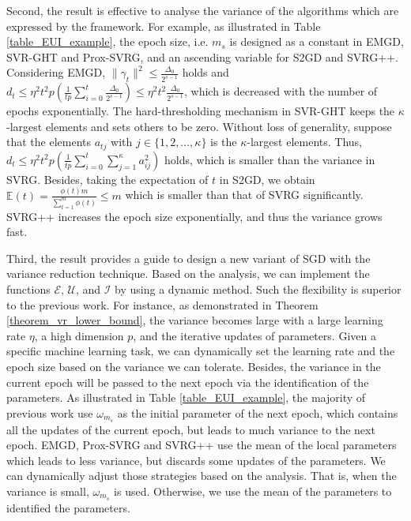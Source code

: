 \documentclass[letterpaper]{article}
\begin{document}
Second, the result is effective to analyse the variance of the algorithms which are expressed by the framework. For example, as illustrated in Table \ref{table_EUI_example}, the epoch size, i.e. $m_s$ is designed as a constant in EMGD, SVR-GHT and Prox-SVRG, and  an ascending variable for  S2GD and SVRG++. Considering EMGD,  $\parallel \gamma_t \parallel^2 \le \frac{\Delta_0}{2^{s-1}}$ holds and $d_t\mathrm{\le} \eta^2 t^2 p \left( \frac{1}{tp}\sum\limits_{i=0}^t   \frac{\Delta_0}{2^{s-1}} \right) \mathrm{\le}  \eta^2t^2 \frac{\Delta_0}{2^{s-1}}$, which is decreased with the number of epochs exponentially. The hard-thresholding mechanism in SVR-GHT keeps the $\kappa$-largest elements and sets others to be zero. Without loss of generality, suppose that the elements $a_{tj}$ with $j\mathrm{\in}\{1,2, ..., \kappa\}$ is the $\kappa$-largest elements. Thus, $d_t \mathrm{\le}  \eta^2 t^2p  \left( \frac{1}{tp}\sum\limits_{i=0}^t   \sum\limits_{j=1}^{\kappa}   a_{ij}^2 \right)$  holds, which is smaller than the variance in SVRG. Besides, taking the expectation of $t$ in S2GD, we obtain $\mathbb{E}(t)=\frac{\phi(t)m}{\sum_{t=1}^m \phi(t)} \mathrm{\le}  m$ which is smaller than that of SVRG significantly. SVRG++ increases the epoch size exponentially, and thus the variance grows fast.  

Third, the result provides a guide to design a new variant of SGD with the variance reduction technique.   Based on the analysis, we can implement the functions  $\mathcal{E}$, $\mathcal{U}$, and $\mathcal{I}$ by using a dynamic method. Such the flexibility  is superior to the previous work.  For instance, as demonstrated in Theorem \ref{theorem_vr_lower_bound}, the variance becomes large with a large learning rate $\eta$, a high dimension $p$, and the iterative updates of parameters.  Given a specific machine learning task, we can dynamically set  the learning rate and the epoch size based on the variance we can tolerate. Besides, the variance in the current epoch will be passed to the next epoch via the identification of the parameters. As illustrated in Table \ref{table_EUI_example},  the majority of previous work use $\omega_{m_s}$ as the initial parameter of the next epoch, which contains all the updates of the current epoch, but leads to much variance to the next epoch. EMGD, Prox-SVRG and SVRG++ use the mean of  the local parameters which leads to less variance, but discards some updates of the parameters. We can dynamically adjust those strategies based on the analysis. That is, when the variance is small, $\omega_{m_s}$ is used. Otherwise, we use the mean of the parameters to identified the parameters. 
\end{document}
